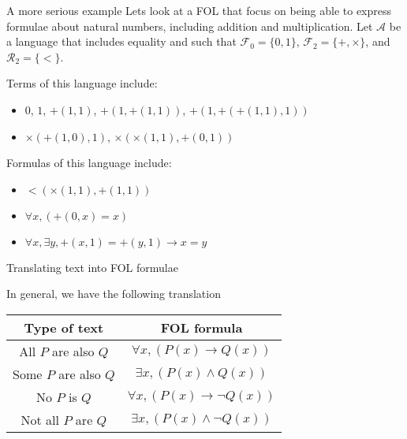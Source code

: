 \documentclass[aspectratio=169]{beamer}
\begin{document}
\begin{slide}{A more serious example}
  Lets look at a FOL that focus on being able to express formulae about natural numbers, including addition and multiplication. Let $\mathcal{A}$ be a language that includes equality and such that $\mathcal{F}_0 = \{0,1\}$, $\mathcal{F}_2 = \{+,\times\}$, and $\mathcal{R}_2 = \{<\}$.
  
  Terms of this language include:
  \begin{itemize}
  \item $0$, $1$, $+(1,1)$, $+(1,+(1,1))$, $+(1,+(+(1,1),1))$
  \item $\times(+(1,0),1)$, $\times(\times(1,1),+(0,1))$  
  \end{itemize}
  
  Formulas of this language include:
  \begin{itemize}
  \item $<(\times(1,1),+(1,1))$
  \item $\forall x, (+(0,x) = x)$
  \item $\forall x, \exists y, +(x,1) = +(y,1) \to x = y$  
  \end{itemize}


\end{slide}

\begin{slide}{Translating text into FOL formulae}
\begin{block}{In general, we have the following translation}
\begin{center}
\begin{tabular}{c|c}
Type of text &  FOL formula \\ \hline
 All $P$ are also $Q$ & $\forall x, (P(x) \to Q(x))$ \\
 Some $P$ are also $Q$ & $\exists x, (P(x) \land Q(x))$ \\
 No $P$ is $Q$ & $\forall x, (P(x) \to \neg Q(x))$ \\
 Not all $P$ are $Q$ & $\exists x, (P(x) \land \neg Q(x))$
\end{tabular}
\end{center}
\end{block}
\end{slide}
\end{document}
